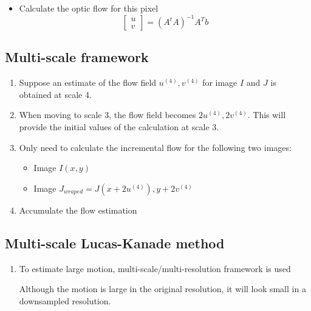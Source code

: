 \documentclass[9pt]{article}
\begin{document}
\begin{multicols*}{2}
\begin{enumerate}
\begin{itemize}
\begin{itemize}
                \item Calculate the optic flow for this pixel 
                $$
                    \begin{bmatrix}
                        u \\ v
                    \end{bmatrix} = (A^t A)^{-1} A^T b
                $$
            \end{itemize}
        \end{itemize}
    \end{enumerate}

    \subsection{Multi-scale framework}
    \begin{enumerate}
        \item Suppose an estimate of the flow field $u^{(4)}, v^{(4)}$ for image $I$ and $J$ is obtained 
        at scale 4.

        \item When moving to scale 3, the flow field becomes $2u^{(4)},
        2v^{(4)}$. This will provide the initial values of the calculation at
        scale 3.
        
        \item Only need to calculate the incremental flow for the following two images:
        \begin{itemize}
            \item Image $I(x,y)$
            \item Image $J_{wraped} = J(x + 2u^{(4)}), y + 2v^{(4)}$
        \end{itemize}

        \item Accumulate the flow estimation 
    \end{enumerate}

    \subsection{Multi-scale Lucas-Kanade method}
    \begin{enumerate}
        \item To estimate large motion, multi-scale/multi-resolution framework is used 
        
        Although the motion is large in the original resolution, it will look small in a 
        downsampled resolution.


\end{enumerate}
\end{multicols*}
\end{document}
